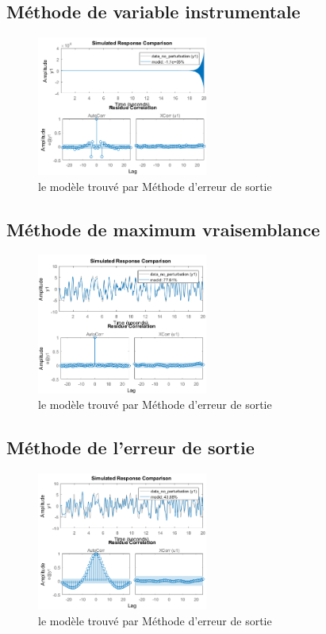\documentclass[twoside,twocolumn]{article}
\begin{document}
\subsection{Méthode de variable instrumentale}
\begin{figure}[H]
\centering
\includegraphics[width=0.5\textwidth]{Images/11.png}
\caption{ le modèle trouvé par Méthode d'erreur de sortie}
\end{figure}

\subsection{Méthode de maximum vraisemblance}
\begin{figure}[H]
\centering
\includegraphics[width=0.5\textwidth]{Images/12.png}
\caption{ le modèle trouvé par Méthode d'erreur de sortie}
\end{figure}

\subsection{Méthode de l'erreur de sortie}
\begin{figure}[H]
\centering
\includegraphics[width=0.5\textwidth]{Images/13.png}
\caption{ le modèle trouvé par Méthode d'erreur de sortie}
\end{figure}
\end{document}
